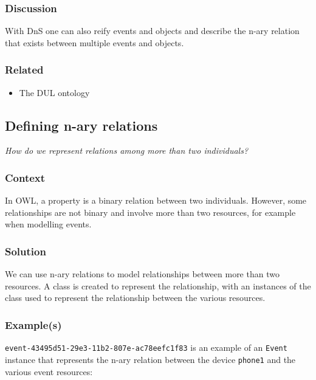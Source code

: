 \subsubsection{Discussion}

With \ac{DnS} one can also reify events and objects and describe the n-ary relation that exists between multiple events and objects. 


\subsubsection{Related}

\begin{itemize}
	\item The \ac{DUL} ontology \cite{Gangemi2008}
\end{itemize}




\subsection{Defining n-ary relations}

\emph{How do we represent relations among more than two individuals?}

\subsubsection{Context}
In \ac{OWL}, a property is a binary relation between two individuals. However, some relationships are not binary and involve more than two resources, for example when modelling events.

\subsubsection{Solution}
We can use n-ary relations \cite{Noy2006} to model relationships between more than two resources. A class is created to represent the relationship, with an instances of the class used to represent the relationship between the various resources.

\subsubsection{Example(s)}
\texttt{event-43495d51-29e3-11b2-807e-ac78eefc1f83} is an example of an \texttt{Event} instance that represents the n-ary relation between the device \texttt{phone1} and the various event resources: 


